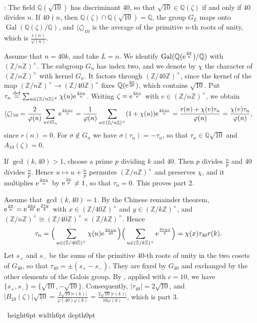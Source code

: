 \documentclass[leqno]{article}
\newcommand{\Z}{\ensuremath{\mathbb{Z}}}
\newcommand{\qed}{\hfill \vrule height6pt  width6pt depth0pt}
\let\i\relax %
\newcommand{\i}{\mathrm{i}}
\newcommand{\ov}{\overset}
\newcommand{\e}{\mathrm{e}} %
\newenvironment{proof}[1][]{\noindent {\it Proof #1} : }{\hbox{~}\qed
\smallskip
}
\numberwithin{equation}{section}
\begin{document}
\begin{proof}
The field $\mathbb{Q}(\sqrt{10})$ has discriminant $40$, so that $\sqrt{10} \in \mathbb{Q}(\zeta)$ if and only if $40$ divides $n$. If $40 \nmid n$, then $\mathbb{Q}(\zeta) \cap \mathbb{Q}(\sqrt{10}) = \mathbb{Q}$, the group $G_L$ maps onto $\operatorname{Gal}(\mathbb{Q}(\zeta)/\mathbb{Q})$, and $\langle\zeta\rangle_{10}$ is the average of the primitive $n$-th roots of unity, which is $\frac{r(n)}{\varphi(n)}$.

Assume that $n = 40k$, and take $L = n$. We identify $\operatorname{Gal}(\mathbb{Q}(\e^{\frac{2\pi\i}{n}})/\mathbb{Q})$ with $(\Z/n\Z)^\times$. The subgroup $G_n$ has index two, and we denote by $\chi$ the character of $(\Z/n\Z)^\times$ with kernel $G_n$. It factors through $(\Z/40\Z)^\times$, since the kernel of the map $(\Z/n\Z)^\times \to (\Z/40\Z)^\times$ fixes $\mathbb{Q}(\e^{\frac{2\pi\i}{40}})$, which contains $\sqrt{10}$. Put $\tau_n \ov{\mathrm{def}}{=} \sum_{u \in (\Z/n\Z)^\times}\chi(u)\e^{\frac{2\pi\i u}{n}}$. Writing $\zeta = \e^{\frac{2\pi\i v}{n}}$ with $v \in (\Z/n\Z)^\times$, we obtain
\[
\langle\zeta\rangle_{10} = \frac{2}{\varphi(n)}\sum_{u \in G_n}\e^{\frac{2\pi\i uv}{n}} = \frac{1}{\varphi(n)}\sum_{u \in (\Z/n\Z)^\times}(1+\chi(u))\e^{\frac{2\pi\i uv}{n}} = \frac{r(n)+\chi(v)\tau_n}{\varphi(n)} = \frac{\chi(v)\tau_n}{\varphi(n)},
\]
since $r(n) = 0$. For $\sigma \notin G_n$ we have $\sigma(\tau_n) = -\tau_n$, so that $\tau_n \in \mathbb{Q}\sqrt{10}$ and $A_{10}(\zeta) = 0$.

If $\gcd(k,40) > 1$, choose a prime $p$ dividing $k$ and $40$. Then $p$ divides $\frac np$ and $40$ divides $\frac np$. Hence $u \mapsto u+\frac np$ permutes $(\Z/n\Z)^\times$ and preserves $\chi$, and it multiplies $\e^{\frac{2\pi\i u}{n}}$ by $\e^{\frac{2\pi\i}{p}} \neq 1$, so that $\tau_n = 0$. This proves part 2.

Assume that $\gcd(k,40) = 1$. By the Chinese remainder theorem, $\e^{\frac{2\pi\i}{n}} = \e^{\frac{2\pi\i x}{40}}\e^{\frac{2\pi\i y}{k}}$ with $x \in (\Z/40\Z)^\times$ and $y \in (\Z/k\Z)^\times$, and $(\Z/n\Z)^\times \cong (\Z/40\Z)^\times \times (\Z/k\Z)^\times$. Hence
\[
\tau_n = \Big(\sum_{u \in (\Z/40\Z)^\times}\chi(u)\e^{\frac{2\pi\i xu}{40}}\Big)\Big(\sum_{u \in (\Z/k\Z)^\times}\e^{\frac{2\pi\i yu}{k}}\Big) = \chi(x)\tau_{40} r(k).
\]
Let $s_+$ and $s_-$ be the sums of the primitive $40$-th roots of unity in the two cosets of $G_{40}$, so that $\tau_{40} = \pm(s_+-s_-)$. They are fixed by $G_{40}$ and exchanged by the other elements of the Galois group. By \cite[proof of Theorem 6.2, Case 2, p.~18]{Lar14}, applied with $c = 10$, we have $\{s_+,s_-\} = \{\sqrt{10},-\sqrt{10}\}$. Consequently, $|\tau_{40}| = 2\sqrt{10}$, and $|B_{10}(\zeta)|\sqrt{10} = \frac{2\sqrt{10} |r(k)|}{\varphi(40)\varphi(k)} = \frac{2\sqrt{10} |r(k)|}{16\varphi(k)}$, which is part 3.


\end{proof}
\end{document}
